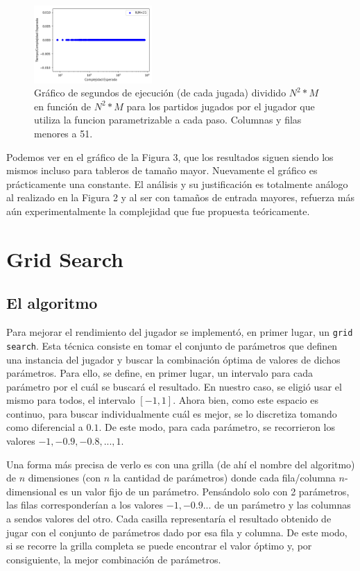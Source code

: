 \documentclass[A4paper,oneside,fleqn,11pt]{article}
\theoremstyle{definition}
\begin{document}
\begin{figure}
	\includegraphics[width=0.4\textwidth]{complejidad2b.png}
	\caption{ Gráfico de segundos de ejecución (de cada jugada) dividido $N^2 *M$ en función de $N^2 * M$ para los partidos jugados por el jugador que utiliza la funcion parametrizable a cada paso. Columnas y filas menores a 51.}
\end{figure}

Podemos ver en el gráfico de la Figura 3, que los resultados siguen siendo los mismos incluso para tableros de tamaño mayor. Nuevamente el gráfico es prácticamente una constante. El análisis y su justificación es totalmente análogo al realizado en la Figura 2 y al ser con tamaños de entrada mayores, refuerza más aún experimentalmente la complejidad que fue propuesta teóricamente.






\section{Grid Search}



\subsection{El algoritmo}

Para mejorar el rendimiento del jugador se implementó, en primer lugar, un \texttt{grid search}. Esta técnica consiste en tomar el conjunto de parámetros que definen una instancia del jugador y buscar la combinación óptima de valores de dichos parámetros. Para ello, se define, en primer lugar, un intervalo para cada parámetro por el cuál se buscará el resultado. En nuestro caso, se eligió usar el mismo para todos, el intervalo $[-1,1]$. Ahora bien, como este espacio es continuo, para buscar individualmente cuál es mejor, se lo discretiza tomando como diferencial a $0.1$. De este modo, para cada parámetro, se recorrieron los valores $-1, -0.9,-0.8,...,1$.

Una forma más precisa de verlo es con una grilla (de ahí el nombre del algoritmo) de $n$ dimensiones (con $n$ la cantidad de parámetros) donde cada fila/columna $n$-dimensional es un valor fijo de un parámetro. Pensándolo solo con 2 parámetros, las filas corresponderían a los valores $-1, -0.9...$ de un parámetro y las columnas a sendos valores del otro. Cada casilla representaría el resultado obtenido de jugar con el conjunto de parámetros dado por esa fila y columna. De este modo, si se recorre la grilla completa se puede encontrar el valor óptimo y, por consiguiente, la mejor combinación de parámetros.
\end{document}
